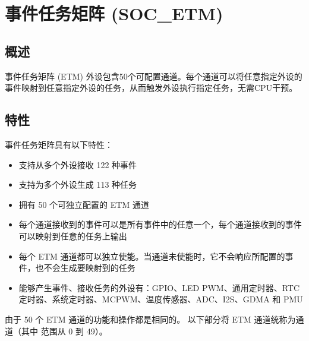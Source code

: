 \documentclass[main\_\_CN.tex]{subfiles}
\begin{document}

\ifglobal
\else
    {\let\clearpage\relax \listoftodos}
    {\let\clearpage\relax \listofdonetodos}
    \tableofcontents
\fi



\hypertarget{evntaskmatrix}{}
\chapter{事件任务矩阵 (SOC\_ETM)}
\label{mod:evntaskmatrix}


\section{概述}
事件任务矩阵 (ETM) 外设包含50个可配置通道。每个通道可以将任意指定外设的事件映射到任意指定外设的任务，从而触发外设执行指定任务，无需CPU干预。


\section{特性}
\label{sec:evntaskmatrix-features}

事件任务矩阵具有以下特性：
\begin{itemize}
    \item 支持从多个外设接收 122 种事件
    \item 支持为多个外设生成 113 种任务
    \item 拥有 50 个可独立配置的 ETM 通道
    \item 每个通道接收到的事件可以是所有事件中的任意一个，每个通道接收到的事件可以映射到任意的任务上输出
    \item 每个 ETM 通道都可以独立使能。当通道未使能时，它不会响应所配置的事件，也不会生成要映射到的任务
    \item 能够产生事件、接收任务的外设有：GPIO、LED PWM、通用定时器、RTC 定时器、系统定时器、MCPWM、温度传感器、ADC、I2S、GDMA 和 PMU
\end{itemize}

由于 50 个 ETM 通道的功能和操作都是相同的。 以下部分将 ETM 通道统称为通道（其中  范围从 0 到 49）。
\end{document}
